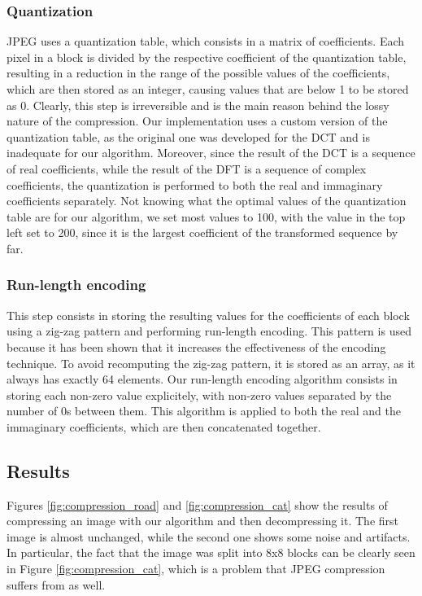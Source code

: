 \subsubsection{Quantization}
JPEG uses a quantization table, which consists in a matrix of coefficients. Each pixel in a block is divided by the respective coefficient of the quantization table, resulting in a reduction in the range of the possible values of the coefficients, which are then stored as an integer, causing values that are below 1 to be stored as 0. Clearly, this step is irreversible and is the main reason behind the lossy nature of the compression. Our implementation uses a custom version of the quantization table, as the original one was developed for the DCT and is inadequate for our algorithm. Moreover, since the result of the DCT is a sequence of real coefficients, while the result of the DFT is a sequence of complex coefficients, the quantization is performed to both the real and immaginary coefficients separately. Not knowing what the optimal values of the quantization table are for our algorithm, we set most values to 100, with the value in the top left set to 200, since it is the largest coefficient of the transformed sequence by far.

\subsubsection{Run-length encoding}
This step consists in storing the resulting values for the coefficients of each block using a zig-zag pattern and performing run-length encoding. This pattern is used because it has been shown that it increases the effectiveness of the encoding technique. To avoid recomputing the zig-zag pattern, it is stored as an array, as it always has exactly 64 elements. Our run-length encoding algorithm consists in storing each non-zero value explicitely, with non-zero values separated by the number of 0s between them. This algorithm is applied to both the real and the immaginary coefficients, which are then concatenated together.

\subsection{Results}
Figures \ref{fig:compression_road} and \ref{fig:compression_cat} show the results of compressing an image with our algorithm and then decompressing it. The first image is almost unchanged, while the second one shows some noise and artifacts. In particular, the fact that the image was split into 8x8 blocks can be clearly seen in Figure \ref{fig:compression_cat}, which is a problem that JPEG compression suffers from as well. 

